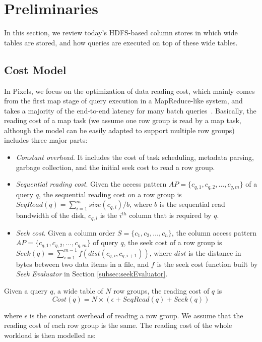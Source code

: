 \section{Preliminaries}

In this section, we review today's HDFS-based column stores in which wide tables are stored, and how queries are executed on top of these wide tables.

\subsection{Cost Model}

In Pixels, we focus on the optimization of data reading cost, which mainly comes from the first map stage of query execution in a MapReduce-like system, and takes a majority of the end-to-end latency for many batch queries~\cite{ColumnOrdering}. Basically, the reading cost of a map task (we assume one row group is read by a map task, although the model can be easily adapted to support multiple row groups) includes three major parts:
\begin{itemize}
	\item \textit{Constant overhead}. It includes the cost of task scheduling, metadata parsing, garbage collection, and the initial seek cost to read a row group.
	
	\item \textit{Sequential reading cost}. Given the access pattern $AP=\{c_{q,1},c_{q,2},\dots,c_{q,m}\}$ of a query $q$, the sequential reading cost on a row group is $SeqRead(q)=\sum_{i=1}^{m}size(c_{q,i})/b$, where $b$ is the sequential read bandwidth of the disk, $c_{q,i}$ is the $i^{th}$ column that is required by $q$.
	
	\item \textit{Seek cost}. Given a column order $S=\{c_1, c_2,\dots,c_n\}$, the column access pattern $AP=\{c_{q,1},c_{q,2},\dots,c_{q,m}\}$ of query $q$, the seek cost of a row group is $Seek(q)=\sum_{i=1}^{m-1}f(dist(c_{q,i},c_{q,i+1}))$, where $dist$ is the distance in bytes between two data items in a file, and $f$ is the seek cost function built by \textit{Seek Evaluator} in Section \ref{subsec:seekEvaluator}.
\end{itemize}

\begin{Definition}\label{equ:qcost}
	Given a query $q$, a wide table of $N$ row groups, the reading cost of $q$ is
	\begin{equation}
	Cost(q) = N\times(\epsilon+SeqRead(q)+Seek(q))
	\label{equ:querycost}
	\end{equation}
\end{Definition} 
where $\epsilon$ is the constant overhead of reading a row group.
We assume that the reading cost of each row group is the same.
The reading cost of the whole workload is then modelled as:

